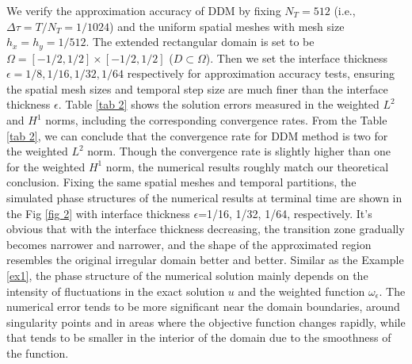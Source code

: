 \documentclass[3p,times]{elsarticle}
\numberwithin{equation}{section}
\begin{document}
We verify the approximation accuracy of DDM by fixing $N_T=512$ (i.e., $\Delta \tau = T/N_T=1/1024$) and the uniform spatial meshes with mesh size $h_x=h_y=1/512$. The extended rectangular domain is set to be $\Omega=[-1/2,1/2]\times[-1/2,1/2]$ ($D \subset \Omega$). Then we set the interface thickness $\epsilon=1/8,1/16,1/32, 1/64$ respectively for approximation accuracy tests, ensuring the spatial mesh sizes and temporal step size are much finer than the interface thickness $\epsilon$. Table \ref{tab 2} shows the solution errors measured in the weighted $L^2$ and $H^1$ norms, including the corresponding convergence rates. From the Table \ref{tab 2}, we can conclude that the convergence rate for DDM method is two for the weighted $L^2$ norm. Though the convergence rate is slightly higher than one for the weighted $H^1$ norm, the numerical results roughly match our theoretical conclusion. Fixing the same spatial meshes and temporal partitions, the simulated phase structures of the numerical results at terminal time are shown in the Fig \ref{fig 2} with interface thickness $\epsilon$=1/16, 1/32, 1/64, respectively. It's obvious that with the interface thickness decreasing, the transition zone gradually becomes narrower and narrower, and the shape of the approximated region resembles the original irregular domain better and better. Similar as the Example \ref{ex1}, the phase structure of the numerical solution mainly depends on the intensity of fluctuations in the exact solution $u$ and the weighted function $\omega_{\epsilon}$. The numerical error tends to be more significant near the domain boundaries, around singularity points and in areas where the objective function changes rapidly, while that tends to be smaller in the interior of the domain due to the smoothness of the function.  
\end{document}
